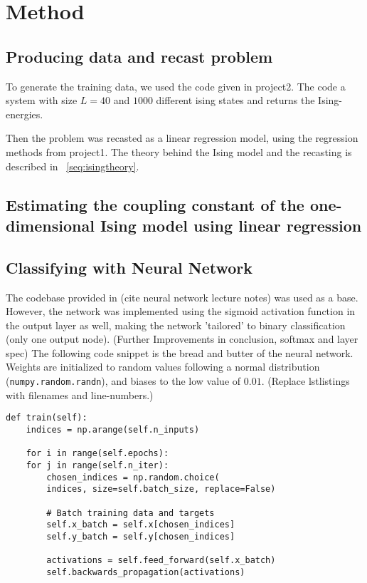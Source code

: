 \section{Method}

\subsection{Producing data and recast problem}
To generate the training data, we used the code given in 
project2. 
The code a system with size \(L=40\) and \(1000\) different 
ising states and returns the Ising-energies. 

Then the problem was recasted as a linear regression model, using 
the regression methods from project1. The theory behind 
the Ising model and the recasting is described in ~\ref{seq:isingtheory}.

\subsection{Estimating the coupling constant of the one-dimensional Ising model using linear regression}

\subsection{Classifying with Neural Network}
The codebase provided in (cite neural network lecture notes) was
used as a base. However, the network was implemented using the sigmoid
activation function in the output layer as well, making the network
'tailored' to binary classification (only one output node). 
(Further Improvements in conclusion, softmax and layer spec)
The following code snippet is the bread and butter of the neural
network. Weights are initialized to random values following a
normal distribution (\lstinline{numpy.random.randn}), and biases
to the low value of $0.01$.
(Replace lstlistings with filenames and line-numbers.)
\begin{lstlisting}
def train(self):
    indices = np.arange(self.n_inputs)

    for i in range(self.epochs):
	for j in range(self.n_iter):
	    chosen_indices = np.random.choice(
		indices, size=self.batch_size, replace=False)

	    # Batch training data and targets
	    self.x_batch = self.x[chosen_indices]
	    self.y_batch = self.y[chosen_indices]

	    activations = self.feed_forward(self.x_batch)
	    self.backwards_propagation(activations)
\end{lstlisting}
